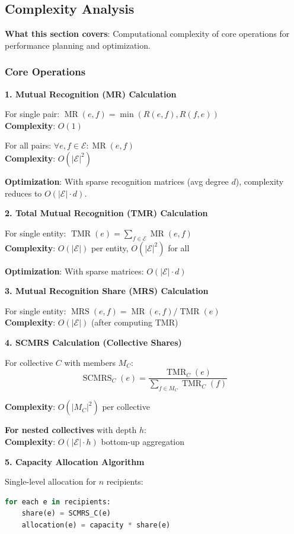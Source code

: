 \documentclass[11pt,a4paper]{article}
\theoremstyle{definition}
\theoremstyle{remark}
\newcommand{\E}{\mathcal{E}}
\DeclareMathOperator{\TMR}{TMR}
\DeclareMathOperator{\MR}{MR}
\DeclareMathOperator{\MRS}{MRS}
\DeclareMathOperator{\SCMRS}{SCMRS}
\begin{document}
\subsection{Complexity Analysis}

\textbf{What this section covers}: Computational complexity of core operations for performance planning and optimization.

\subsubsection{Core Operations}

\textbf{1. Mutual Recognition (MR) Calculation}

For single pair: $\MR(e,f) = \min(R(e,f), R(f,e))$\\
\textbf{Complexity}: $O(1)$

For all pairs: $\forall e,f \in \E: \MR(e,f)$\\
\textbf{Complexity}: $O(|\E|^2)$

\textbf{Optimization}: With sparse recognition matrices (avg degree $d$), complexity reduces to $O(|\E| \cdot d)$.

\textbf{2. Total Mutual Recognition (TMR) Calculation}

For single entity: $\TMR(e) = \sum_{f \in \E} \MR(e,f)$\\
\textbf{Complexity}: $O(|\E|)$ per entity, $O(|\E|^2)$ for all

\textbf{Optimization}: With sparse matrices: $O(|\E| \cdot d)$

\textbf{3. Mutual Recognition Share (MRS) Calculation}

For single entity: $\MRS(e,f) = \MR(e,f) / \TMR(e)$\\
\textbf{Complexity}: $O(|\E|)$ (after computing TMR)

\textbf{4. SCMRS Calculation (Collective Shares)}

For collective $C$ with members $M_C$:
\[ \SCMRS_C(e) = \frac{\TMR_C(e)}{\sum_{f \in M_C} \TMR_C(f)} \]

\textbf{Complexity}: $O(|M_C|^2)$ per collective

\textbf{For nested collectives} with depth $h$:\\
\textbf{Complexity}: $O(|\E| \cdot h)$ bottom-up aggregation

\textbf{5. Capacity Allocation Algorithm}

Single-level allocation for $n$ recipients:
\begin{lstlisting}[language=Python]
for each e in recipients:
    share(e) = SCMRS_C(e)
    allocation(e) = capacity * share(e)
\end{lstlisting}
\end{document}

